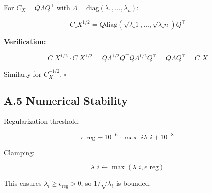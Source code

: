 For $C_X = Q \Lambda Q^\top$ with $\Lambda = \mathrm{diag}(\lambda_1, \dots, \lambda_n)$:

\[
C\_X^{1/2} = Q \mathrm{diag}(\sqrt{\lambda\_1}, \dots, \sqrt{\lambda\_n}) Q^\top
\tag{A.10}
\]

\textbf{Verification:}

\[
C\_X^{1/2} \cdot C\_X^{1/2} = Q \Lambda^{1/2} Q^\top Q \Lambda^{1/2} Q^\top = Q \Lambda Q^\top = C\_X
\tag{A.11}
\]

Similarly for $C_X^{-1/2}$. $\square$

\subsection{A.5 Numerical Stability}

Regularization threshold:

\[
\epsilon\_\text{reg} = 10^{-6} \cdot \max\_i \lambda\_i + 10^{-8}
\tag{A.12}
\]

Clamping:

\[
\lambda\_i \leftarrow \max(\lambda\_i, \epsilon\_\text{reg})
\tag{A.13}
\]

This ensures $\lambda_i \geq \epsilon_\text{reg} > 0$, so $1/\sqrt{\lambda_i}$ is bounded.